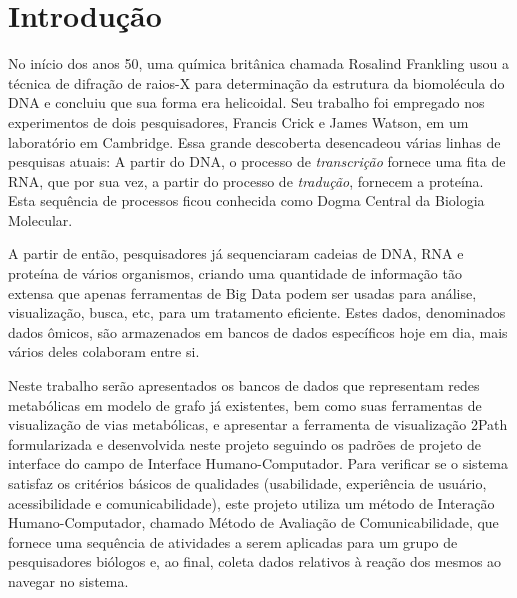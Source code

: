 \chapter{Introdução}


\indent No início dos anos 50, uma química britânica chamada Rosalind Frankling usou a técnica de difração de raios-X para determinação da estrutura da biomolécula do DNA e concluiu que sua forma era helicoidal. Seu trabalho foi empregado nos experimentos de dois pesquisadores, Francis Crick e James Watson, em um laboratório em Cambridge. Essa grande descoberta desencadeou várias linhas de pesquisas atuais: A partir do DNA, o processo de \textit{transcrição} fornece uma fita de RNA, que por sua vez, a partir do processo de \textit{tradução}, fornecem a proteína. Esta sequência de processos ficou conhecida como Dogma Central da Biologia Molecular.


\indent A partir de então, pesquisadores já sequenciaram cadeias de DNA, RNA e proteína de vários organismos, criando uma quantidade de informação tão extensa que apenas ferramentas de Big Data podem ser usadas para análise, visualização, busca, etc, para um tratamento eficiente. Estes dados, denominados dados ômicos, são armazenados em bancos de dados específicos hoje em dia, mais vários deles colaboram entre si. 

\indent Neste trabalho serão apresentados os bancos de dados que representam redes metabólicas em modelo de grafo já existentes, bem como suas ferramentas de visualização de vias metabólicas, e apresentar a ferramenta de visualização 2Path formularizada e desenvolvida neste projeto seguindo os padrões de projeto de interface do campo de Interface Humano-Computador. Para verificar se o sistema satisfaz os critérios básicos de qualidades (usabilidade, experiência de usuário, acessibilidade e comunicabilidade), este projeto utiliza um método de Interação Humano-Computador, chamado Método de Avaliação de Comunicabilidade, que fornece uma sequência de atividades a serem aplicadas para um grupo de pesquisadores biólogos e, ao final, coleta dados relativos à reação dos mesmos ao navegar no sistema.




